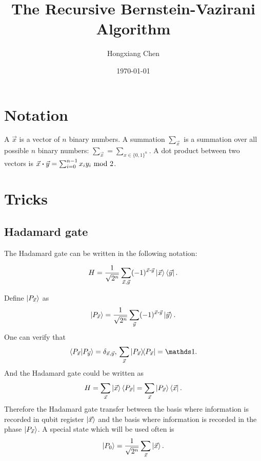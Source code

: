 \documentclass{article}
\title{The Recursive Bernstein-Vazirani Algorithm}
\date{\today}
\author{Hongxiang Chen}
\begin{document}
\maketitle
{}
\tableofcontents

\section{Notation}
\label{sec:Notation}

A $\vec{x}$ is a vector of $n$ binary numbers. A summation $\sum_{\vec{x}}$ is a
summation over all possible $n$ binary numbers: $\sum_{\vec{x}}=\sum_{x\in
  \{0,1\}^n}$. A dot product between two vectors is $\vec{x}\vdot\vec{y} =
  \sum_{i=0}^{n-1} x_i y_i \text{ mod }2$.

\section{Tricks}
\label{sec:Tricks}

\subsection{Hadamard gate}
\label{sec:Hadamard gate}

The Hadamard gate can be written in the following notation:

\begin{equation}
  H = \frac{1}{\sqrt{2^n}}\sum_{\vec{x},\vec{y}} (-1)^{\vec{x}\vdot\vec{y}}
  \ket{\vec{x}}\bra{\vec{y}}.
\end{equation}

Define $\ket{P_{\vec{x}}}$ as
\begin{equation}
  \ket{P_{\vec{x}}} = \frac{1}{\sqrt{2^n}} \sum_{\vec{y}}
  (-1)^{\vec{x}\vdot\vec{y}} \ket{\vec{y}}.
\end{equation}
One can verify that
\begin{equation}
  \braket{P_{\vec{x}} |P_{\vec{y}}} = \delta_{\vec{x},\vec{y}},\,
  \sum_{\vec{x}}\ketbra{P_{\vec{x}}} = \id.
\end{equation}
And the Hadamard gate could be written as
\begin{equation}
  H = \sum_{\vec{x}} \ket{\vec{x}}\bra{P_{\vec{x}}} 
  = \sum_{\vec{x}} \ket{P_{\vec{x}}} \bra{\vec{x}}.
\end{equation}
Therefore the Hadamard gate transfer between the basis where information is
recorded in qubit register $\ket{\vec{x}}$ and the basis where information is
recorded in the phase $\ket{P_{\vec{x}}}$. A special state which will be used
often is
\begin{equation}
  \ket{P_0} = \frac{1}{\sqrt{2^n}} \sum_{\vec{x}}\ket{\vec{x}}.
\end{equation}
\end{document}
